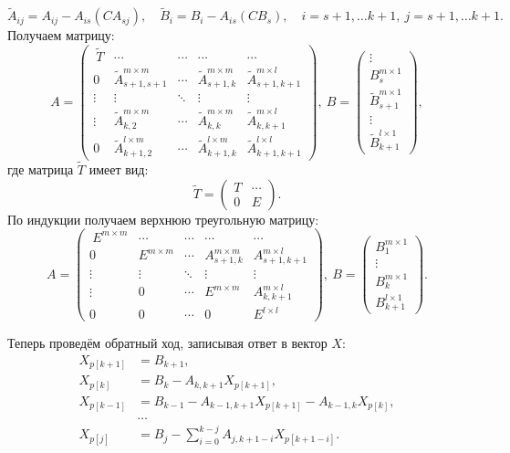 \documentclass[a4paper,12pt]{article}
\begin{document}
$$
\widetilde{A}_{ij} = A_{ij} - A_{is}(CA_{sj}),\quad \widetilde{B}_i=B_i - A_{is}(CB_s),\quad i =s+1,\dots k+1,\ j=s+1,\dots k+1.
$$
Получаем матрицу:
$$A=
  \begin{pmatrix} 
    \ \widetilde{T} & \cdots & \cdots & \cdots & \cdots \\
    0  & \widetilde{A}_{s+1,s+1}^{m\times m} & \cdots &\widetilde{A}_{s+1,k}^{m \times m} & \widetilde{A}_{s+1,k+1}^{m \times l} \\ 
    \vdots & \vdots & \ddots & \vdots & \vdots \\ 
    \vdots& \widetilde{A}_{k,2}^{m \times m} & \cdots & \widetilde{A}_{k,k}^{m \times m} & \widetilde{A}_{k,k+1}^{m \times l} \\
    0 & \widetilde{A}_{k+1,2}^{l \times m} & \cdots & \widetilde{A}_{k+1,k}^{l \times m} & \widetilde{A}_{k+1,k+1}^{l \times l} 
  \end{pmatrix},\ 
  B=
  \begin{pmatrix}
  \vdots \\
  B_{s}^{m\times 1}\\
  \widetilde{B}_{s+1}^{m\times 1}\\
  \vdots\\
  \widetilde{B}_{k+1}^{l\times 1}
  \end{pmatrix},
$$
где матрица $\widetilde{T}$ имеет вид:
$$\widetilde{T} =
  \begin{pmatrix} 
  T & \cdots \\
  0 & E
  \end{pmatrix}.
$$
По индукции получаем верхнюю треугольную матрицу:
$$A=
  \begin{pmatrix} 
    \ E^{m\times m} & \cdots & \cdots & \cdots & \cdots \\
    0  & E^{m\times m} & \cdots &A_{s+1,k}^{m \times m} & A_{s+1,k+1}^{m \times l} \\ 
    \vdots & \vdots & \ddots & \vdots & \vdots \\ 
    \vdots& 0 & \cdots & E^{m\times m} & A_{k,k+1}^{m \times l} \\
    0 & 0 & \cdots & 0 & E^{l \times l} 
  \end{pmatrix},\ 
  B=
   \begin{pmatrix}
    B_{1}^{m\times 1} \\
     \vdots \\
     B_{k}^{m\times 1}\\
     B_{k+1}^{l\times 1}
    \end{pmatrix}.
$$

\newpage
Теперь проведём обратный ход, записывая ответ в вектор $X$:
\begin{align*}
X_{p[k+1]} &= B_{k+1}, \\
X_{p[k]} &= B_k - A_{k,k+1}X_{p[k+1]}, \\
X_{p[k-1]} &= B_{k-1} - A_{k-1,k+1}X_{p[k+1]} - A_{k-1,k}X_{p[k]}, \\
&\dots \\
X_{p[j]} &= B_j - \sum_{i=0}^{k-j} A_{j,k+1-i}X_{p[k+1-i]}.
\end{align*}
\end{document}

